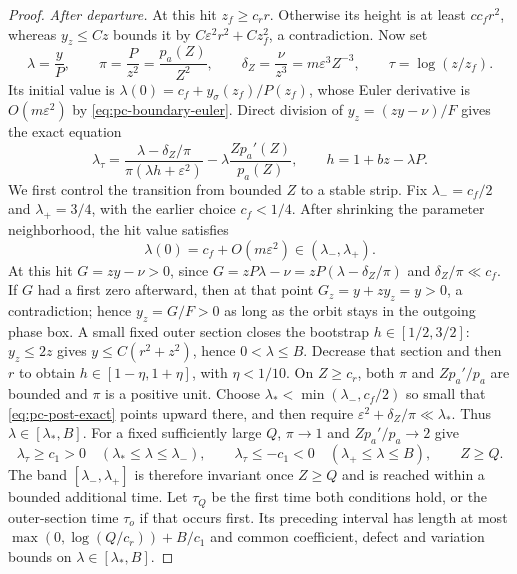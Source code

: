 \begin{proof}
\medskip\noindent\textit{After departure.}\quad
At this hit $z_f\ge c_r r$. Otherwise its height is at least
$cc_fr^2$, whereas $y_z\le Cz$ bounds it by
$C\varepsilon^2r^2+Cz_f^2$, a contradiction. Now set
\[
 \lambda=\frac yP,\qquad \pi=\frac P{z^2}=\frac{p_a(Z)}{Z^2},
 \qquad \delta_Z=\frac\nu{z^3}=m\varepsilon^3Z^{-3},
 \qquad \tau=\log(z/z_f).
\]
Its initial value is
$\lambda(0)=c_f+y_\sigma(z_f)/P(z_f)$, whose Euler derivative is
$O(m\varepsilon^2)$ by \eqref{eq:pc-boundary-euler}.  Direct division of
$y_z=(zy-\nu)/F$ gives the exact equation
\begin{equation}\label{eq:pc-post-exact}
 \lambda_\tau=
 \frac{\lambda-\delta_Z/\pi}{\pi(\lambda h+\varepsilon^2)}
 -\lambda\frac{Zp_a'(Z)}{p_a(Z)},\qquad
 h=1+bz-\lambda P.
\end{equation}
We first control the transition from bounded $Z$ to a stable strip.
Fix \(\lambda_-=c_f/2\) and \(\lambda_+=3/4\), with the earlier choice
\(c_f<1/4\). After shrinking the parameter neighborhood, the hit value
satisfies
\[
 \lambda(0)=c_f+O(m\varepsilon^2)\in(\lambda_-,\lambda_+).
\]
At this hit \(G=zy-\nu>0\), since
\(G=zP\lambda-\nu=zP(\lambda-\delta_Z/\pi)\) and
\(\delta_Z/\pi\ll c_f\).  If \(G\) had a first zero afterward, then
at that point \(G_z=y+zy_z=y>0\), a contradiction; hence
\(y_z=G/F>0\) as long as the orbit stays in the outgoing phase box.
A small fixed outer section closes the bootstrap $h\in[1/2,3/2]$:
$y_z\le2z$ gives $y\le C(r^2+z^2)$, hence $0<\lambda\le B$.
Decrease that section and then $r$ to obtain
$h\in[1-\eta,1+\eta]$, with $\eta<1/10$.
On $Z\ge c_r$, both $\pi$ and $Zp_a'/p_a$ are bounded and $\pi$ is a
positive unit. Choose
$\lambda_*<\min(\lambda_-,c_f/2)$ so small that
\eqref{eq:pc-post-exact} points upward there, and then require
$\varepsilon^2+\delta_Z/\pi\ll\lambda_*$. Thus
$\lambda\in[\lambda_*,B]$. For a fixed sufficiently large $Q$,
$\pi\to1$ and $Zp_a'/p_a\to2$ give
\[
 \lambda_\tau\ge c_1>0\quad(\lambda_*\le\lambda\le\lambda_-),\qquad
 \lambda_\tau\le-c_1<0\quad(\lambda_+\le\lambda\le B),
 \qquad Z\ge Q.
\]
The band $[\lambda_-,\lambda_+]$ is therefore invariant once $Z\ge Q$
and is reached within a bounded additional time. Let $\tau_Q$ be the
first time both conditions hold, or the outer-section time $\tau_o$
if that occurs first. Its preceding interval has length at most
$\max(0,\log(Q/c_r))+B/c_1$ and common coefficient, defect and
variation bounds on $\lambda\in[\lambda_*,B]$.


\end{proof}
